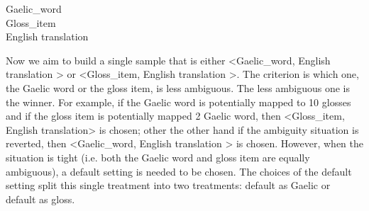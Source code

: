 \documentclass[a4paper]{article}
\begin{document}
\begin{exe} 
\ex 
	\gll	 Gaelic\_word\\  
     		 Gloss\_item \\
    \glt    English translation  
\end{exe} 

Now we aim to build a single sample that is either <Gaelic\_word, English translation > or <Gloss\_item, English translation >. The criterion is which one, the Gaelic word or the gloss item, is less ambiguous. The less ambiguous one is the winner. For example, if the Gaelic word is potentially mapped to 10 glosses and if the gloss item is potentially mapped 2 Gaelic word, then <Gloss\_item, English translation> is chosen; other the other hand if the ambiguity situation is reverted, then <Gaelic\_word, English translation > is chosen. However, when the situation is tight (i.e. both the Gaelic word and gloss item are equally ambiguous), a default setting is needed to be chosen. The choices of the default setting split this single treatment into two treatments: default as Gaelic or default as gloss.
\end{document}
